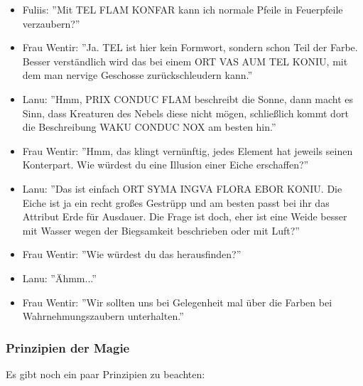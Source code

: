 \documentclass{article}
\begin{document}
\begin{itemize}
\item Fuliis: ''Mit TEL FLAM KONFAR kann ich normale Pfeile in Feuerpfeile verzaubern?''
\item Frau Wentir: ''Ja. TEL ist hier kein Formwort, sondern schon Teil der Farbe. Besser verständlich wird das bei einem ORT VAS AUM TEL KONIU, mit dem man nervige Geschosse zurückschleudern kann.''
\item Lanu: ''Hmm, PRIX CONDUC FLAM beschreibt die Sonne, dann macht es Sinn, dass Kreaturen des Nebels diese nicht mögen, schließlich kommt dort die Beschreibung WAKU CONDUC NOX am besten hin.''
\item Frau Wentir: ''Hmm, das klingt vernünftig, jedes Element hat jeweils seinen Konterpart. Wie würdest du eine Illusion einer Eiche erschaffen?''
\item Lanu: ''Das ist einfach ORT SYMA INGVA FLORA EBOR KONIU. Die Eiche ist ja ein recht großes Gestrüpp und am besten passt bei ihr das Attribut Erde für Ausdauer. Die Frage ist doch, eher ist eine Weide besser mit Wasser wegen der Biegsamkeit beschrieben oder mit Luft?''
\item Frau Wentir: ''Wie würdest du das herausfinden?''
\item Lanu: ''Ähmm...''
\item Frau Wentir: ''Wir sollten uns bei Gelegenheit mal über die Farben bei Wahrnehmungszaubern unterhalten.''
\end{itemize}

\subsubsection{Prinzipien der Magie}

Es gibt noch ein paar Prinzipien zu beachten:
\end{document}
